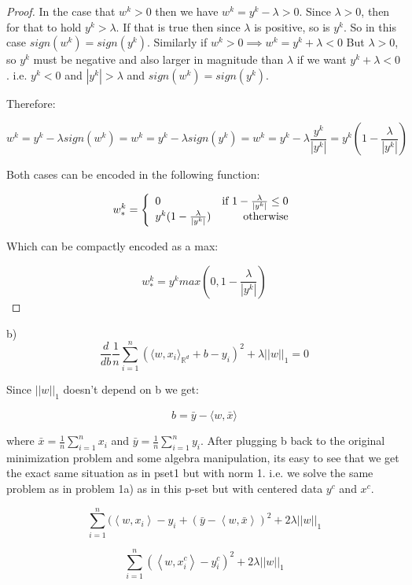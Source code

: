 \documentclass[12pt]{report}
\begin{document}
\begin{proof}
In the case that $w^k > 0$ then we have $w^k =  y^k - \lambda > 0$. Since $\lambda > 0$, then for that to hold $y^k > \lambda$. If that is true then since $\lambda$ is positive, so is $y^k$. So in this case $sign(w^k) = sign(y^k)$. Similarly if $w^k > 0 \implies w^k =  y^k + \lambda < 0$ But $\lambda > 0$, so $y^k$ must be negative and also larger in magnitude than $\lambda$ if we want $ y^k + \lambda < 0$. i.e. $y^k < 0$ and $|y^k| > \lambda$ and $sign(w^k) = sign(y^k)$.

Therefore:

$$w^k =  y^k - \lambda sign(w^k) = w^k =  y^k - \lambda sign(y^k) = w^k = y^k - \lambda \frac{y^k}{|y^k|} = y^k (1- \frac{\lambda}{|y^k|} )$$

Both cases can be  encoded in the following function:

\begin{displaymath}
   w_*^k = \left\{
     \begin{array}{lr}
       0 & $if $  1- \frac{\lambda}{|y^k|} \leq 0\\
       y^k (1- \frac{\lambda}{|y^k|}) & $otherwise$ 
     \end{array}
   \right.
\end{displaymath}

Which can be compactly encoded as a max:

$$
\boxed{
w_*^k = y^k max(0, 1- \frac{\lambda}{|y^k|} )
}
$$
\end{proof}

b)
$$\frac{d}{db}\frac{1}{n}\sum_{i=1}^{n}(\langle w, x_i\rangle_{\mathbb{R}^d} +b - y_i)^2 + \lambda ||w||_1 = 0$$

Since $||w||_1$ doesn't depend on b we get:

$$b= \bar{y} -\langle w, \bar{x} \rangle$$

where $\bar{x} = \frac{1}{n}\sum^{n}_{i=1}x_i$ and $\bar{y} = \frac{1}{n}\sum^{n}_{i=1}y_i$. After plugging b back to the original minimization problem and some algebra manipulation, its easy to see that we get the exact same situation as in pset1 but with norm 1. i.e. we solve the same problem as in problem 1a) as in this p-set but with centered data $y^c$ and $x^c$.

$$ \sum_{i=1}^n ( \left\langle w, x_i \right\rangle - y_i + (\bar y -  \left\langle w, \bar x \right\rangle  ) ^2  + 2 \lambda ||w||_1$$

$$
\boxed{
\sum_{i=1}^n (\left\langle w, x_i^c \right\rangle - y_i^c) ^2 +  2 \lambda ||w||_1
}
$$

\end{document}
